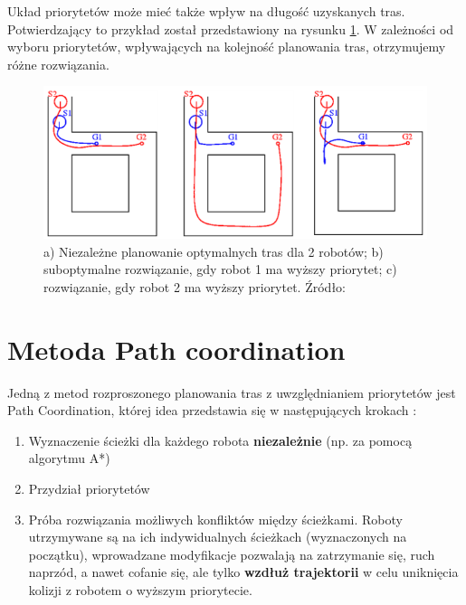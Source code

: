 Układ priorytetów może mieć także wpływ na długość uzyskanych tras. Potwierdzający to przykład został przedstawiony na rysunku \ref{fig:image_article1_ppt6}. W zależności od wyboru priorytetów, wpływających na kolejność planowania tras, otrzymujemy różne rozwiązania.
\begin{figure}
	\centering
	\includegraphics[width=13cm]{img/article1/ppt6}
	\caption{a) Niezależne planowanie optymalnych tras dla 2 robotów; b) suboptymalne rozwiązanie, gdy robot 1 ma wyższy priorytet; c) rozwiązanie, gdy robot 2 ma wyższy priorytet. Źródło: \cite{optpriorities}}
	\label{fig:image_article1_ppt6}
\end{figure}

\section{Metoda Path coordination}
Jedną z metod rozproszonego planowania tras z uwzględnianiem priorytetów jest Path Coordination, której idea przedstawia się w następujących krokach \cite{optpriorities}:
\begin{enumerate}
	\item Wyznaczenie ścieżki dla każdego robota {\bf niezależnie} (np. za pomocą algorytmu A*)
	\item Przydział priorytetów
	\item Próba rozwiązania możliwych konfliktów między ścieżkami. Roboty utrzymywane są na ich indywidualnych ścieżkach (wyznaczonych na początku), wprowadzane modyfikacje pozwalają na zatrzymanie się, ruch naprzód, a nawet cofanie się, ale tylko {\bf wzdłuż trajektorii} w celu uniknięcia kolizji z robotem o wyższym priorytecie.
\end{enumerate}